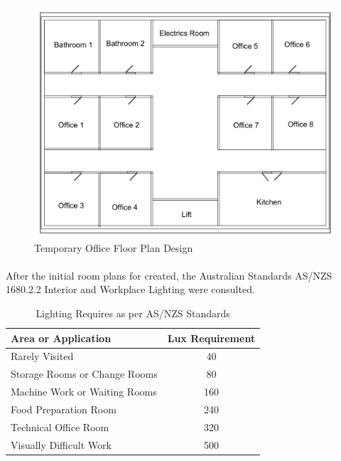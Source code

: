 \begin{figure}[H]
\hfill\includegraphics[width = 120mm]{images/Rough_Floorplan}\hspace*{\fill}
\caption{Temporary Office Floor Plan Design} 
\label{fig:RoughFloorplan}
\end{figure} 

\paragraph{}
After the initial room plans for created, the Australian Standards AS/NZS 1680.2.2 Interior and Workplace Lighting were consulted. 

\begin{table}[!ht]
\centering
\renewcommand{\arraystretch}{2}
\begin{tabular}{|l|c|}
\hline
\textbf{Area or Application} & \multicolumn{1}{l|}{\textbf{Lux Requirement}} \\ \hline
Rarely Visited & 40 \\ \hline
Storage Rooms or Change Rooms & 80 \\ \hline
Machine Work or Waiting Rooms & 160 \\ \hline
Food Preparation Room & 240 \\ \hline
Technical Office Room & 320 \\ \hline
Visually Difficult Work & 500 \\ \hline
\end{tabular}
\caption{Lighting Requires as per AS/NZS Standards \cite{StandardsAustralia2006}}
\label{LightingRequirements}
\end{table}